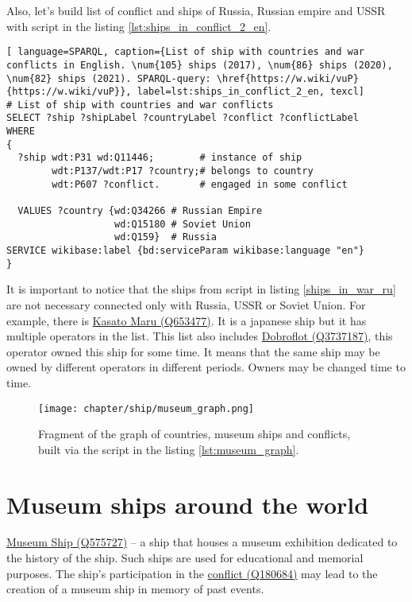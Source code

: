 \label{question:ship_3}

Also, let's build list of conflict and ships of Russia, Russian empire and USSR with script in the listing \ref{lst:ships_in_conflict_2_en}.

\begin{lstlisting}[ language=SPARQL, caption={List of ship with countries and war conflicts in English. \num{105} ships (2017), \num{86} ships (2020), \num{82} ships (2021). SPARQL-query: \href{https://w.wiki/vuP}{https://w.wiki/vuP}}, label=lst:ships_in_conflict_2_en, texcl]
# List of ship with countries and war conflicts
SELECT ?ship ?shipLabel ?countryLabel ?conflict ?conflictLabel
WHERE
{
  ?ship wdt:P31 wd:Q11446;        # instance of ship
        wdt:P137/wdt:P17 ?country;# belongs to country
        wdt:P607 ?conflict.       # engaged in some conflict
  
  VALUES ?country {wd:Q34266 # Russian Empire
                   wd:Q15180 # Soviet Union
                   wd:Q159}  # Russia
SERVICE wikibase:label {bd:serviceParam wikibase:language "en"}
}
\end{lstlisting}

It is important to notice that the ships from script in listing \ref{ships_in_war_ru} are not necessary connected only with Russia, USSR or Soviet Union.
For example, there is \href{https://www.wikidata.org/wiki/Q653477}{Kasato Maru (Q653477)}. It is a japanese ship but it has multiple operators in the list. This list also includes \href{https://www.wikidata.org/wiki/Q3737187}{Dobroflot (Q3737187)}, this operator owned this ship for some time. It means that the same ship may be owned by different operators in different periods. Owners may be changed time to time.

\begin{figure*}[ht]
  \texttt{[image: chapter/ship/museum\_graph.png]}
  \caption[Graph of countries and museum ships]{Fragment of the graph of countries, museum ships and conflicts, built via the script in the listing \ref{lst:museum_graph}.}%
  \label{fig:museum_graph}%
\end{figure*}
\section{Museum ships around the world}
\href{https://www.wikidata.org/wiki/Q575727}{Museum Ship (Q575727)} -- a ship that houses a museum exhibition dedicated to the history of the ship. Such ships are used for educational and memorial purposes. The ship's participation in the \href{https://www.wikidata.org/wiki/Q180684}{conflict (Q180684)} may lead to the creation of a museum ship in memory of past events.

